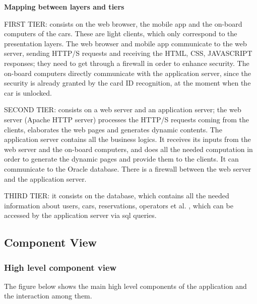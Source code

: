 \documentclass{article}
\begin{document}
\begin{flushleft}
\textbf{Mapping between layers and tiers}
\begin{description}
\item FIRST TIER: consists on the web browser, the mobile app and the on-board computers of the cars. These are light clients, which only correspond to the presentation layers. The web browser and mobile app communicate to the web server, sending HTTP/S requests and receiving the HTML, CSS, JAVASCRIPT responses;  they need to get through a firewall in order to enhance security. The on-board computers directly communicate with the application server, since the security is already granted by the card ID recognition, at the moment when the car is unlocked.
\item SECOND TIER: consists on a web server and an application server; the web server (Apache HTTP server) processes the HTTP/S requests coming from the clients, elaborates the web pages and generates dynamic contents. The application server contains all the business logics. It receives its inputs from the web server and the on-board computers, and does all the needed computation in order to generate the dynamic pages and  provide them 
to the clients. It can communicate to the Oracle database. There is a firewall between the web server and the application server.
\item THIRD TIER:  it consists on the database, which contains all the needed information about users, cars, reservations, operators et al. , which can be accessed by the application server via sql queries.


\end{description}







\subsection{Component View}  %
\subsubsection{High level component view} %
The figure below shows the main high level components of the application and the interaction among them.
\vspace{1.5cm}



\end{flushleft}
\end{document}
